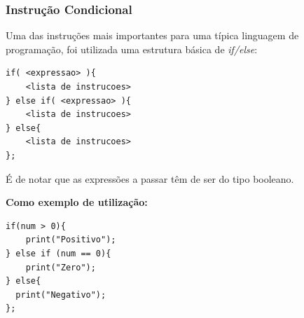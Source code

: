 \documentclass[10pt,portuguese]{article}
\begin{document}
\subsubsection{Instrução Condicional}
\par Uma das instruções mais importantes para uma típica linguagem de programação, foi utilizada uma estrutura básica de \emph{if/else}:
\begin{lstlisting}[numbers=none]
if( <expressao> ){
    <lista de instrucoes>
} else if( <expressao> ){
    <lista de instrucoes>
} else{
    <lista de instrucoes>
};
\end{lstlisting}
\newline
\par É de notar que as expressões a passar têm de ser do tipo booleano.
\newline
\par \textbf{Como exemplo de utilização:}
\begin{lstlisting}[numbers=none]
if(num > 0){
    print("Positivo");
} else if (num == 0){
    print("Zero");
} else{
  print("Negativo");
};
\end{lstlisting}
\end{document}
